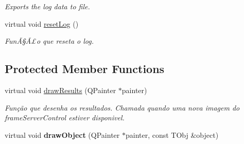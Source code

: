 \begin{DoxyCompactItemize}
\begin{DoxyCompactList}\small\item\em Exports the log data to file. \end{DoxyCompactList}\item 
\hypertarget{class_tracker_control_a0f269bca8139be827d8f673bed676f60}{}virtual void \hyperlink{class_tracker_control_a0f269bca8139be827d8f673bed676f60}{reset\+Log} ()\label{class_tracker_control_a0f269bca8139be827d8f673bed676f60}

\begin{DoxyCompactList}\small\item\em FunÃ§Ã£o que reseta o log. \end{DoxyCompactList}\end{DoxyCompactItemize}
\subsection*{Protected Member Functions}
\begin{DoxyCompactItemize}
\item 
\hypertarget{class_tracker_control_aa429fbdf6a7f790d22dd1f23616f41de}{}virtual void \hyperlink{class_tracker_control_aa429fbdf6a7f790d22dd1f23616f41de}{draw\+Results} (Q\+Painter $\ast$painter)\label{class_tracker_control_aa429fbdf6a7f790d22dd1f23616f41de}

\begin{DoxyCompactList}\small\item\em Função que desenha os resultados. Chamada quando uma nova imagem do frame\+Server\+Control estiver disponivel. \end{DoxyCompactList}\item 
\hypertarget{class_tracker_control_ac36825442b03cbca4d3d57a89eb398e2}{}virtual void {\bfseries draw\+Object} (Q\+Painter $\ast$painter, const T\+Obj \&object)\label{class_tracker_control_ac36825442b03cbca4d3d57a89eb398e2}

\end{DoxyCompactItemize}
